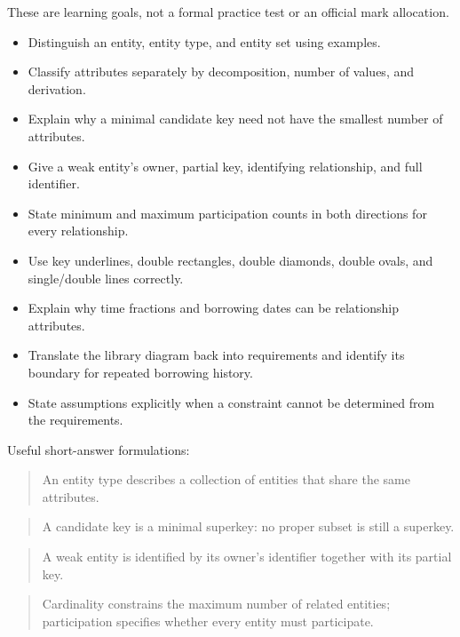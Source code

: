 These are learning goals, not a formal practice test or an official mark allocation.

\begin{itemize}
\tightlist
\item[$\square$]
  Distinguish an entity, entity type, and entity set using examples.
\item[$\square$]
  Classify attributes separately by decomposition, number of values, and derivation.
\item[$\square$]
  Explain why a minimal candidate key need not have the smallest number of attributes.
\item[$\square$]
  Give a weak entity's owner, partial key, identifying relationship, and full identifier.
\item[$\square$]
  State minimum and maximum participation counts in both directions for every relationship.
\item[$\square$]
  Use key underlines, double rectangles, double diamonds, double ovals, and single/double lines correctly.
\item[$\square$]
  Explain why time fractions and borrowing dates can be relationship attributes.
\item[$\square$]
  Translate the library diagram back into requirements and identify its boundary for repeated borrowing history.
\item[$\square$]
  State assumptions explicitly when a constraint cannot be determined from the requirements.
\end{itemize}

Useful short-answer formulations:

\begin{quote}
An entity type describes a collection of entities that share the same attributes.
\end{quote}

\begin{quote}
A candidate key is a minimal superkey: no proper subset is still a superkey.
\end{quote}

\begin{quote}
A weak entity is identified by its owner's identifier together with its partial key.
\end{quote}

\begin{quote}
Cardinality constrains the maximum number of related entities; participation specifies whether every entity must participate.
\end{quote}

